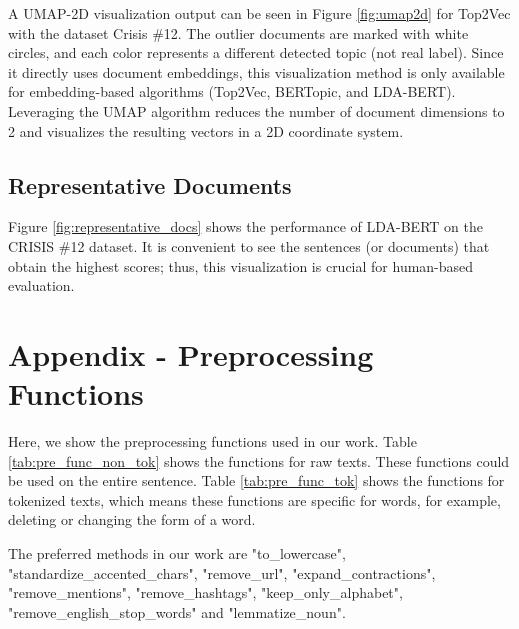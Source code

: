 \documentclass[11pt]{article}
\begin{document}
A UMAP-2D visualization output can be seen in Figure \ref{fig:umap2d} for Top2Vec with the dataset Crisis \#12. The outlier documents are marked with white circles, and each color represents a different detected topic (not real label). Since it directly uses document embeddings, this visualization method is only available for embedding-based algorithms (Top2Vec, BERTopic, and LDA-BERT). Leveraging the UMAP algorithm reduces the number of document dimensions to 2 and visualizes the resulting vectors in a 2D coordinate system.

\subsection{Representative Documents} \label{appendix_draw_representative_documents}
Figure \ref{fig:representative_docs} shows the performance of LDA-BERT on the CRISIS \#12 dataset. It is convenient to see the sentences (or documents) that obtain the highest scores; thus, this visualization is crucial for human-based evaluation. 

\section{Appendix - Preprocessing Functions}
\label{sec:pre_func}
Here, we show the preprocessing functions used in our work. Table \ref{tab:pre_func_non_tok} shows the functions for raw texts. These functions could be used on the entire sentence. Table \ref{tab:pre_func_tok} shows the functions for tokenized texts, which means these functions are specific for words, for example, deleting or changing the form of a word.

The preferred methods in our work are "to\_lowercase", "standardize\_accented\_chars", "remove\_url", "expand\_contractions", "remove\_mentions", "remove\_hashtags", "keep\_only\_alphabet", "remove\_english\_stop\_words" and "lemmatize\_noun".
\end{document}
